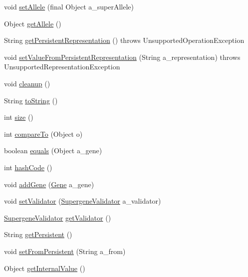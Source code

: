 \begin{DoxyCompactItemize}
\item 
void \hyperlink{classorg_1_1jgap_1_1supergenes_1_1_abstract_supergene_a7b3ce455ac6d30ba31b198ce6824cd19}{set\-Allele} (final Object a\-\_\-super\-Allele)
\item 
Object \hyperlink{classorg_1_1jgap_1_1supergenes_1_1_abstract_supergene_a45f21f887ad34c02fbc88d41e5d0372d}{get\-Allele} ()
\item 
String \hyperlink{classorg_1_1jgap_1_1supergenes_1_1_abstract_supergene_a41a4e0b1cf2366722b5f3b97a1711487}{get\-Persistent\-Representation} ()  throws Unsupported\-Operation\-Exception 
\item 
void \hyperlink{classorg_1_1jgap_1_1supergenes_1_1_abstract_supergene_af8156c2a8b41bc9fe3e397595c513a6d}{set\-Value\-From\-Persistent\-Representation} (String a\-\_\-representation)  throws Unsupported\-Representation\-Exception 
\item 
void \hyperlink{classorg_1_1jgap_1_1supergenes_1_1_abstract_supergene_aec3dc6646255f4187aa9a6b4238a9a2c}{cleanup} ()
\item 
String \hyperlink{classorg_1_1jgap_1_1supergenes_1_1_abstract_supergene_a67a9b1dfccb63d4b2909abdd3e8c1abe}{to\-String} ()
\item 
int \hyperlink{classorg_1_1jgap_1_1supergenes_1_1_abstract_supergene_a8d2326c3d5ce80c73dff063f26994233}{size} ()
\item 
int \hyperlink{classorg_1_1jgap_1_1supergenes_1_1_abstract_supergene_ac17432577a59856d6ef81abaf0a66bf9}{compare\-To} (Object o)
\item 
boolean \hyperlink{classorg_1_1jgap_1_1supergenes_1_1_abstract_supergene_a80be2241977a41672bdbaa85acb7eabc}{equals} (Object a\-\_\-gene)
\item 
int \hyperlink{classorg_1_1jgap_1_1supergenes_1_1_abstract_supergene_a73c5c7702d66268b71e9ed92f0c5d41d}{hash\-Code} ()
\item 
void \hyperlink{classorg_1_1jgap_1_1supergenes_1_1_abstract_supergene_a8b9835e9be1cc5edc8507c957b1f1f2d}{add\-Gene} (\hyperlink{interfaceorg_1_1jgap_1_1_gene}{Gene} a\-\_\-gene)
\item 
void \hyperlink{classorg_1_1jgap_1_1supergenes_1_1_abstract_supergene_afae838561a1237ab6b39456ab0e3b8c8}{set\-Validator} (\hyperlink{interfaceorg_1_1jgap_1_1supergenes_1_1_supergene_validator}{Supergene\-Validator} a\-\_\-validator)
\item 
\hyperlink{interfaceorg_1_1jgap_1_1supergenes_1_1_supergene_validator}{Supergene\-Validator} \hyperlink{classorg_1_1jgap_1_1supergenes_1_1_abstract_supergene_a9ebb4d5fbce8752cba54188ad5958fcf}{get\-Validator} ()
\item 
String \hyperlink{classorg_1_1jgap_1_1supergenes_1_1_abstract_supergene_aa7990463e784192581d7d7918cd0f1b1}{get\-Persistent} ()
\item 
void \hyperlink{classorg_1_1jgap_1_1supergenes_1_1_abstract_supergene_a70a5435dbf92b886ab7d5bbcd2d79d09}{set\-From\-Persistent} (String a\-\_\-from)
\item 
Object \hyperlink{classorg_1_1jgap_1_1supergenes_1_1_abstract_supergene_af4b0e1f740b6aa78679ab71c51568cea}{get\-Internal\-Value} ()
\end{DoxyCompactItemize}
